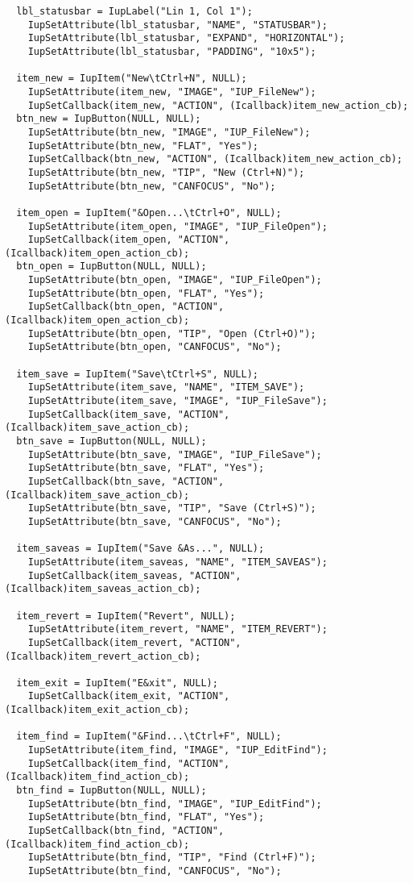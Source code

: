 \documentclass{ctexart}
\begin{document}
\begin{lstlisting}
  lbl_statusbar = IupLabel("Lin 1, Col 1");
    IupSetAttribute(lbl_statusbar, "NAME", "STATUSBAR");  
    IupSetAttribute(lbl_statusbar, "EXPAND", "HORIZONTAL");
    IupSetAttribute(lbl_statusbar, "PADDING", "10x5");

  item_new = IupItem("New\tCtrl+N", NULL);
    IupSetAttribute(item_new, "IMAGE", "IUP_FileNew");
    IupSetCallback(item_new, "ACTION", (Icallback)item_new_action_cb);
  btn_new = IupButton(NULL, NULL);
    IupSetAttribute(btn_new, "IMAGE", "IUP_FileNew");
    IupSetAttribute(btn_new, "FLAT", "Yes");
    IupSetCallback(btn_new, "ACTION", (Icallback)item_new_action_cb);
    IupSetAttribute(btn_new, "TIP", "New (Ctrl+N)");
    IupSetAttribute(btn_new, "CANFOCUS", "No");

  item_open = IupItem("&Open...\tCtrl+O", NULL);
    IupSetAttribute(item_open, "IMAGE", "IUP_FileOpen");
    IupSetCallback(item_open, "ACTION", (Icallback)item_open_action_cb);
  btn_open = IupButton(NULL, NULL);
    IupSetAttribute(btn_open, "IMAGE", "IUP_FileOpen");
    IupSetAttribute(btn_open, "FLAT", "Yes");
    IupSetCallback(btn_open, "ACTION", (Icallback)item_open_action_cb);
    IupSetAttribute(btn_open, "TIP", "Open (Ctrl+O)");
    IupSetAttribute(btn_open, "CANFOCUS", "No");

  item_save = IupItem("Save\tCtrl+S", NULL);
    IupSetAttribute(item_save, "NAME", "ITEM_SAVE");
    IupSetAttribute(item_save, "IMAGE", "IUP_FileSave");
    IupSetCallback(item_save, "ACTION", (Icallback)item_save_action_cb);
  btn_save = IupButton(NULL, NULL);
    IupSetAttribute(btn_save, "IMAGE", "IUP_FileSave");
    IupSetAttribute(btn_save, "FLAT", "Yes");
    IupSetCallback(btn_save, "ACTION", (Icallback)item_save_action_cb);
    IupSetAttribute(btn_save, "TIP", "Save (Ctrl+S)");
    IupSetAttribute(btn_save, "CANFOCUS", "No");

  item_saveas = IupItem("Save &As...", NULL);
    IupSetAttribute(item_saveas, "NAME", "ITEM_SAVEAS");
    IupSetCallback(item_saveas, "ACTION", (Icallback)item_saveas_action_cb);

  item_revert = IupItem("Revert", NULL);
    IupSetAttribute(item_revert, "NAME", "ITEM_REVERT");
    IupSetCallback(item_revert, "ACTION", (Icallback)item_revert_action_cb);
    
  item_exit = IupItem("E&xit", NULL);
    IupSetCallback(item_exit, "ACTION", (Icallback)item_exit_action_cb);

  item_find = IupItem("&Find...\tCtrl+F", NULL);
    IupSetAttribute(item_find, "IMAGE", "IUP_EditFind");
    IupSetCallback(item_find, "ACTION", (Icallback)item_find_action_cb);
  btn_find = IupButton(NULL, NULL);
    IupSetAttribute(btn_find, "IMAGE", "IUP_EditFind");
    IupSetAttribute(btn_find, "FLAT", "Yes");
    IupSetCallback(btn_find, "ACTION", (Icallback)item_find_action_cb);
    IupSetAttribute(btn_find, "TIP", "Find (Ctrl+F)");
    IupSetAttribute(btn_find, "CANFOCUS", "No");


\end{lstlisting}
\end{document}
